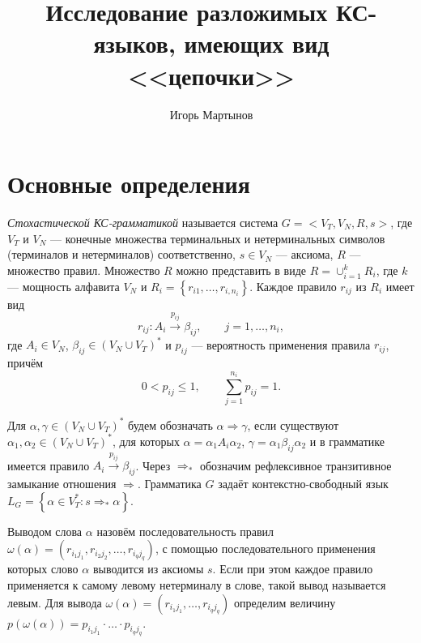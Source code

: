 \documentclass[12pt]{article}
\title{Исследование разложимых КС-языков, имеющих вид <<цепочки>>}
\author{Игорь Мартынов}
\renewcommand{\leq}{\leqslant}
\begin{document}
\clearpage
\setlength{\parindent}{0pt}
\setlength{\parskip}{8pt}


\section{Основные определения}

\textit{Стохастической КС-грамматикой} \cite{fu-struct} называется система $G = <V_T, V_N, R, s>$, где $V_T$ и $V_N$ --- конечные множества терминальных и нетерминальных символов (терминалов и нетерминалов) соответственно, $s \in V_N$ --- аксиома, $R$ --- множество правил. Множество $R$ можно представить в виде $R = \cup_{i = 1}^k R_i$, где $k$ --- мощность алфавита $V_N$ и $R_i = \left\{r_{i1}, \ldots, r_{i,n_i}\right\}$. Каждое правило $r_{ij}$ из $R_i$ имеет вид
\begin{equation}
	r_{ij} : A_i \xrightarrow{p_{ij}} \beta_{ij},\qquad j = 1, \ldots, n_i,
\end{equation}
где $A_i \in V_N$, $\beta_{ij} \in (V_N \cup V_T)^*$ и $p_{ij}$ --- вероятность применения правила $r_{ij}$, причём
\begin{equation}
\label{eq:p_values}
	0 < p_{ij} \leq 1,\qquad \sum_{j = 1}^{n_i} p_{ij} = 1.
\end{equation}

Для $\alpha, \gamma \in (V_N \cup V_T)^*$ будем обозначать $\alpha \Rightarrow \gamma$, если существуют $\alpha_1, \alpha_2 \in (V_N \cup V_T)^*$, для которых $\alpha = \alpha_1 A_i \alpha_2$, $\gamma = \alpha_1 \beta_{ij} \alpha_2$ и в грамматике имеется правило $A_i \xrightarrow{p_{ij}} \beta_{ij}$. Через $\Rightarrow_*$ обозначим рефлексивное транзитивное замыкание отношения $\Rightarrow$. Грамматика $G$ задаёт контекстно-свободный язык $L_G = \left\{ \alpha \in V_T^* : s \Rightarrow_* \alpha\right\}$.

Выводом слова $\alpha$ назовём последовательность правил $\omega(\alpha) = (r_{i_1 j_1}, r_{i_2 j_2}, \ldots, r_{i_q j_q})$, с помощью последовательного применения которых слово $\alpha$ выводится из аксиомы $s$. Если при этом каждое правило применяется к самому левому нетерминалу в слове, такой вывод называется левым. Для вывода $\omega(\alpha) = (r_{i_1 j_1}, \ldots, r_{i_q j_q})$ определим величину $p(\omega(\alpha)) = p_{i_1 j_1} \cdot \ldots \cdot p_{i_q j_q}$.
\end{document}
